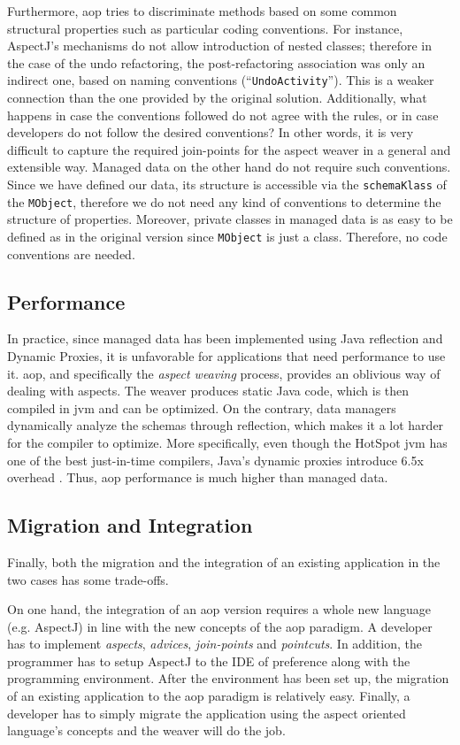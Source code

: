 Furthermore, \ac{aop} tries to discriminate methods based on some common structural properties such as particular coding conventions.
For instance, AspectJ's mechanisms do not allow introduction of nested classes; therefore in the case of the undo refactoring, the post-refactoring association was only an indirect one, based on naming conventions (``\texttt{UndoActivity}'').
This is a weaker connection than the one provided by the original solution.  
Additionally, what happens in case the conventions followed do not agree with the rules, or in case developers do not follow the desired conventions?
In other words, it is very difficult to capture the required join-points for the aspect weaver in a general and extensible way.
Managed data on the other hand do not require such conventions.
Since we have defined our data, its structure is accessible via the \texttt{schemaKlass} of the \texttt{MObject}, therefore we do not need any kind of conventions to determine the structure of properties.
Moreover, private classes in managed data is as easy to be defined as in the original version since \texttt{MObject} is just a class.
Therefore, no code conventions are needed.

\subsection{Performance}
In practice, since managed data has been implemented using Java reflection and Dynamic Proxies, it is unfavorable for applications that need performance to use it.
\ac{aop}, and specifically the \textit{aspect weaving} process, provides an oblivious way of dealing with aspects.
The weaver produces static Java code, which is then compiled in \ac{jvm} and can be optimized.
On the contrary, data managers dynamically analyze the schemas through reflection, which makes it a lot harder for the compiler to optimize. 
More specifically, even though the HotSpot \ac{jvm} has one of the best just-in-time compilers, Java's dynamic proxies introduce 6.5x overhead \cite{marr2015zero}.
Thus, \ac{aop} performance is much higher than managed data.

\subsection{Migration and Integration}
Finally, both the migration and the integration of an existing application in the two cases has some trade-offs.

On one hand, the integration of an \ac{aop} version requires a whole new language (e.g. AspectJ) in line with the new concepts of the \ac{aop} paradigm.
A developer has to implement \textit{aspects}, \textit{advices}, \textit{join-points} and \textit{pointcuts}. 
In addition, the programmer has to setup AspectJ to the IDE of preference along with the programming environment.
After the environment has been set up, the migration of an existing application to the \ac{aop} paradigm is relatively easy.
Finally, a developer has to simply migrate the application using the aspect oriented language's concepts and the weaver will do the job.

